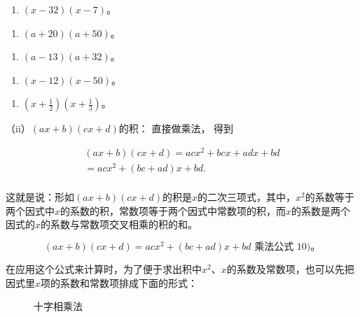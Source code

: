 \begin{enumerate}[start=12]
\item
  \((x - 32)(x - 7)\)。
\end{enumerate}

\begin{enumerate}[start=14]
\item
  \((a + 20)(a + 50)\)。
\end{enumerate}

\begin{enumerate}[start=16]
\item
  \((a - 13)(a + 32)\)。
\end{enumerate}

\begin{enumerate}[start=18]
\item
  \((x - 12)(x - 50)\)。
\end{enumerate}

\begin{enumerate}[start=20]
\item
  \(\left(x + \frac{1}{2}\right)\left(x + \frac{1}{3}\right)\)。
\end{enumerate}

（ii）\((ax + b)(cx + d)\)的积： 直接做乘法， 得到

\[
\begin{array}{l} (a x + b) (c x + d) = a c x ^{2} + b c x + a d x + b d \\ = a c x ^{2} + (b c + a d) x + b d. \\ \end{array}
\]

这就是说：形如\((ax + b)(cx + d)\)的积是\(x\)的二次三项式，其中，\(x^2\)的系数等于两个因式中\(x\)的系数的积，常数项等于两个因式中常数项的积，而\(x\)的系数是两个因式的\(x\)的系数与常数项交叉相乘的积的和。

\[
(a x + b) (c x + d) = a c x ^{2} + (b c + a d) x + b d \text{ 乘法公式 } 10)\text{。}
\]

在应用这个公式来计算时，为了便于求出积中\(x^{2}\)、\(x\)的系数及常数项，也可以先把因式里\(x\)项的系数和常数项排成下面的形式：


\begin{figure}
\centering
\caption{十字相乘法}
\end{figure}

